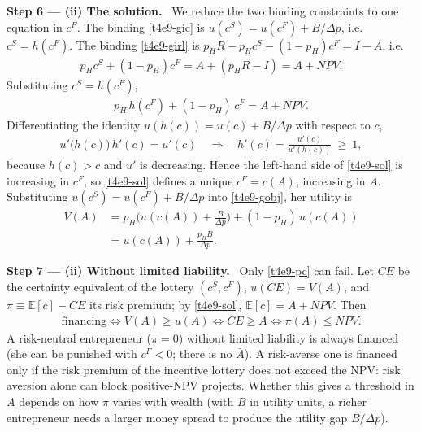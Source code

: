 \documentclass[11pt,a4paper]{article}
\newcommand{\step}[2]{\par\medskip\noindent\textbf{Step #1 --- #2.}~}
\begin{document}
\step{6}{(ii) The solution} We reduce the two binding constraints to one equation in $c^F$. The
binding \eqref{t4e9-gic} is $u(c^S)=u(c^F)+B/\Delta p$, i.e.\ $c^S=h(c^F)$. The binding
\eqref{t4e9-girl} is $p_HR-p_Hc^S-(1-p_H)c^F=I-A$, i.e.
\begin{align}
  p_Hc^S+(1-p_H)c^F=A+(p_HR-I)=A+\mathit{NPV}. \nonumber
\end{align}
Substituting $c^S=h(c^F)$,
\begin{align}
  p_H\,h(c^F)+(1-p_H)\,c^F = A+\mathit{NPV}. \label{t4e9-sol}
\end{align}
Differentiating the identity $u(h(c))=u(c)+B/\Delta p$ with respect to $c$,
\begin{align}
  u'\big(h(c)\big)\,h'(c)=u'(c) \quad\Longrightarrow\quad h'(c)=\frac{u'(c)}{u'(h(c))}\ \ge\ 1, \nonumber
\end{align}
because $h(c)>c$ and $u'$ is decreasing. Hence the left-hand side of \eqref{t4e9-sol} is increasing
in $c^F$, so \eqref{t4e9-sol} defines a unique $c^F=c(A)$, increasing in $A$. Substituting $u(c^S)=u(c^F)+B/\Delta p$ into
\eqref{t4e9-gobj}, her utility is
\begin{align}
  V(A) &= p_H\Big(u(c(A))+\frac{B}{\Delta p}\Big)+(1-p_H)\,u(c(A)) \nonumber\\
       &= u(c(A))+\frac{p_HB}{\Delta p}. \label{t4e9-V}
\end{align}

\step{7}{(ii) Without limited liability} Only \eqref{t4e9-pc} can fail. Let $\mathit{CE}$ be the certainty
equivalent of the lottery $(c^S,c^F)$, $u(\mathit{CE})=V(A)$, and $\pi\equiv \mathbb{E}[c]-\mathit{CE}$ its
risk premium; by \eqref{t4e9-sol}, $\mathbb{E}[c]=A+\mathit{NPV}$. Then
\begin{align}
  \text{financing}\iff V(A)\ge u(A)\iff \mathit{CE}\ge A\iff \pi(A)\le \mathit{NPV}. \label{t4e9-nll}
\end{align}
A risk-neutral entrepreneur ($\pi=0$) without limited liability is always financed (she can be
punished with $c^F<0$; there is no $\bar A$). A risk-averse one is financed only if the risk premium
of the incentive lottery does not exceed the NPV: risk aversion alone can block positive-NPV projects.
Whether this gives a threshold in $A$ depends on how $\pi$ varies with wealth (with $B$ in utility
units, a richer entrepreneur needs a larger money spread to produce the utility gap $B/\Delta p$).
\end{document}

